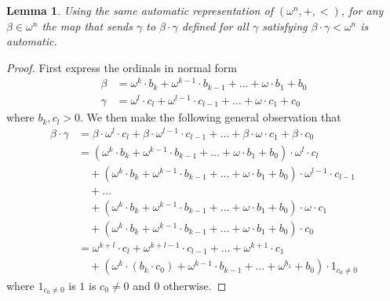 \documentclass[british,a4paper,]{scrartcl}
\newtheorem{lemma}[theorem]{Lemma}
\theoremstyle{definition}
\theoremstyle{remark}
\begin{document}
\begin{lemma} \label{lemma:leftmultiply}
    Using the same automatic representation of \((\omega^n, +, <)\), for any \(\beta\in\omega^n\) the map
    that sends \(\gamma\) to \(\beta\cdot\gamma\) defined for all \(\gamma\) satisfying \(\beta\cdot\gamma<\omega^n\) is automatic.
\end{lemma}
\begin{proof}
    First express the ordinals in normal form
    \begin{align*}
        \beta  &= \omega^k\cdot b_k + \omega^{k-1}\cdot b_{k-1} + \dots + \omega\cdot b_1 + b_0 \\
        \gamma &= \omega^l\cdot c_l + \omega^{l-1}\cdot c_{l-1} + \dots + \omega\cdot c_1 + c_0
    \end{align*}
    where \(b_k, c_l > 0\). We then make the following general observation that
    \begin{align*}
        \beta\cdot\gamma &= \beta\cdot\omega^l\cdot c_l + \beta\cdot\omega^{l-1}\cdot c_{l-1} + \dots + \beta\cdot\omega\cdot c_1 + \beta\cdot c_0 \\
        &= \left( \omega^k\cdot b_k + \omega^{k-1}\cdot b_{k-1} + \dots + \omega\cdot b_1 + b_0 \right)\cdot\omega^l\cdot c_l \\
        &\quad + \left( \omega^k\cdot b_k + \omega^{k-1}\cdot b_{k-1} + \dots + \omega\cdot b_1 + b_0 \right)\cdot\omega^{l-1}\cdot c_{l-1} \\
        &\quad + \dots\\
        &\quad + \left( \omega^k\cdot b_k + \omega^{k-1}\cdot b_{k-1} + \dots + \omega\cdot b_1 + b_0 \right)\cdot\omega\cdot c_1 \\
        &\quad + \left( \omega^k\cdot b_k + \omega^{k-1}\cdot b_{k-1} + \dots + \omega\cdot b_1 + b_0 \right)\cdot c_0 \\
        &= \omega^{k+l}\cdot c_l + \omega^{k+l-1}\cdot c_{l-1} + \dots + \omega^{k+1}\cdot c_1 \\
        &\quad + \left(\omega^k\cdot (b_k\cdot c_0) + \omega^{k-1}\cdot b_{k-1} + \dots + \omega^{b_1} + b_0\right)\cdot 1_{c_0 \ne 0}
    \end{align*}
    where \(1_{c_0 \ne 0}\) is \(1\) is \(c_0 \ne 0\) and \(0\) otherwise.


\end{proof}
\end{document}
